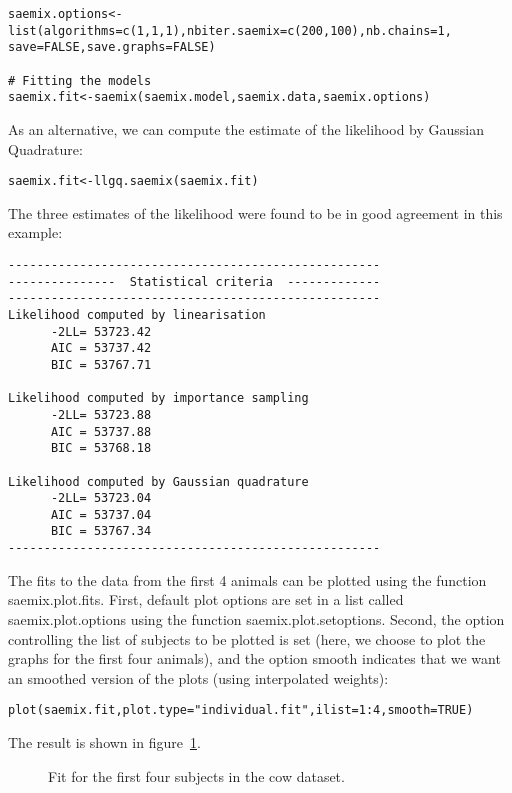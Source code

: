{\begin{verbatim}
saemix.options<-list(algorithms=c(1,1,1),nbiter.saemix=c(200,100),nb.chains=1,
save=FALSE,save.graphs=FALSE)

# Fitting the models
saemix.fit<-saemix(saemix.model,saemix.data,saemix.options)
\end{verbatim}

\par \kern -0.2cm
As an alternative, we can compute the estimate of the likelihood by Gaussian Quadrature:
\begin{verbatim}
saemix.fit<-llgq.saemix(saemix.fit)
\end{verbatim}
The three estimates of the likelihood were found to be in good agreement in this example:
\begin{verbatim}
----------------------------------------------------
---------------  Statistical criteria  -------------
----------------------------------------------------
Likelihood computed by linearisation
      -2LL= 53723.42 
      AIC = 53737.42 
      BIC = 53767.71 

Likelihood computed by importance sampling
      -2LL= 53723.88 
      AIC = 53737.88 
      BIC = 53768.18 

Likelihood computed by Gaussian quadrature
      -2LL= 53723.04 
      AIC = 53737.04 
      BIC = 53767.34 
----------------------------------------------------
\end{verbatim}

\bigskip
The fits to the data from the first 4 animals can be plotted using the function {\sf saemix.plot.fits}. First, default plot options are set in a list called {\sf saemix.plot.options} using the function  {\sf saemix.plot.setoptions}. Second, the option controlling the list of subjects to be plotted is set (here, we choose to plot the graphs for the first four animals), and the option {\sf smooth} indicates that we want an smoothed version of the plots (using interpolated weights):
\begin{verbatim}
plot(saemix.fit,plot.type="individual.fit",ilist=1:4,smooth=TRUE)
\end{verbatim}
The result is shown in figure~\ref{fig:cow.individual}.
\newpage
\begin{figure}[!h]
\begin{center}
\end{center}
\par \kern -0.5cm
\caption{Fit for the first four subjects in the {\sf cow} dataset.} \label{fig:cow.individual}
\end{figure}

}
